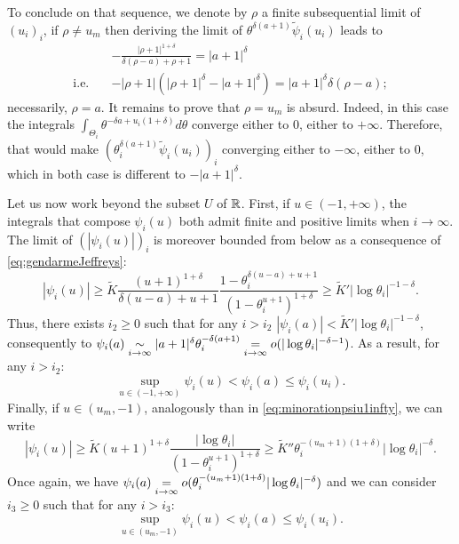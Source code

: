      To conclude on that sequence, we denote by $\rho$ a finite subsequential limit of $(u_i)_i$, if $\rho\ne u_m$ then deriving the limit of $\theta^{\delta(a+1)}\tilde\psi_i(u_i)$ leads to 
        \begin{align}
           & -\frac{|\rho+1|^{1+\delta}}{\delta(\rho-a)+\rho+1} = |a+1|^\delta \nonumber\\
           \text{i.e.}\quad & -|\rho+1|(|\rho+1|^\delta-|a+1|^\delta) = |a+1|^\delta \delta(\rho-a);
        \end{align}
    necessarily, $\rho=a$.
    It remains to prove that $\rho=u_m$ is absurd. Indeed, in this case the integrals $\int_{\Theta_i}\theta^{-\delta a+u_i(1+\delta)}d\theta$ converge either to $0$, either to $+\infty$. Therefore, that would make $(\theta_i^{\delta(a+1)}\tilde\psi_i(u_i))_i$ converging either to $-\infty$, either to $0$, which in both case is different to $-|a+1|^\delta$.



    Let us now work beyond the subset $U$ of $\mathbb{R}$. First, if $u\in(-1,+\infty)$, the integrals that compose $\psi_i(u)$ both admit finite and positive limits when $i\to\infty$. The limit of $(|\psi_i(u)|)_i$ is moreover bounded from below as a consequence of \cref{eq:gendarmeJeffreys}:
        \begin{equation}\label{eq:minorationpsiu1infty}
            |\psi_i(u)|\geq \tilde K\frac{(u+1)^{1+\delta}}{ \delta(u-a)+u+1}\frac{1-\theta_i^{\delta(u-a)+u+1}}{(1-\theta_i^{u+1})^{1+\delta}} \geq \tilde K'|\log\theta_i|^{-1-\delta}.  %
        \end{equation}
    Thus, there exists $i_2\geq0$ such that for any $i>i_2$ $|\psi_i(a)|<\tilde K'|\log\theta_i|^{-1-\delta}$, consequently to $\psi_i(a)\underset{i\rightarrow\infty}{\sim}|a+1|^{\delta}\theta_i^{-\delta(a+1)}\overset{}{\underset{i\rightarrow\infty}{=}}o(|\log\theta_i|^{-\delta-1})$.
    As a result, for any $i>i_2$:
        \begin{equation}
            \sup_{u\in(-1,+\infty)}\psi_i(u)<\psi_i(a)\leq\psi_i(u_i).
        \end{equation}
    Finally, if $u\in(u_m,-1)$, analogously than in \cref{eq:minorationpsiu1infty}, we can write
        \begin{equation}
            |\psi_i(u)|\geq\tilde K(u+1)^{1+\delta}\frac{|\log\theta_i|}{(1-\theta_i^{u+1})^{1+\delta}} \geq \tilde K''\theta_i^{-(u_m+1)(1+\delta)}|\log\theta_i|^{-\delta}.
        \end{equation}
    Once again, we have $\psi_i(a)\overset{}{\underset{i\rightarrow\infty}{=}}o(\theta_i^{-(u_m+1)(1+\delta)}|\log\theta_i|^{-\delta})$ and we can consider $i_3\geq 0$ such that for any $i>i_3$:
        \begin{equation}
            \sup_{u\in(u_m,-1)}\psi_i(u)<\psi_i(a)\leq\psi_i(u_i).
        \end{equation}

